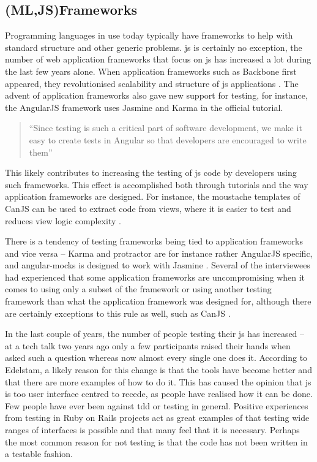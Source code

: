 \documentclass[11pt]{article}
\begin{document}
\subsection{(ML,JS)Frameworks}
\label{subsec:frameworks}

Programming languages in use today typically have frameworks to help with standard structure and other generic problems. \gls{js} is certainly no exception, the number of web application frameworks that focus on \gls{js} has increased a lot during the last few years alone. When application frameworks such as Backbone first appeared, they revolutionised scalability and structure of \gls{js} applications \cite[question~23]{Ahnve}\cite[question~11]{Rovegard}. The advent of application frameworks also gave new support for testing, for instance, the AngularJS framework uses Jasmine and Karma in the official tutorial.

\begin{quote}
``Since testing is such a critical part of software development, we make it easy to create tests in Angular so that developers are encouraged to write them'' \cite{AngularTemplates}
\end{quote}

This likely contributes to increasing the testing of \gls{js} code by developers using such frameworks. This effect is accomplished both through tutorials and the way application frameworks are designed. For instance, the moustache templates of CanJS can be used to extract code from views, where it is easier to test and reduces view logic complexity \cite[question~32]{Ahnve}.

There is a tendency of testing frameworks being tied to application frameworks and vice versa -- Karma and protractor are for instance rather AngularJS specific, and angular-mocks is designed to work with Jasmine \cite[question~7]{Rovegard}. Several of the interviewees had experienced that some application frameworks are uncompromising when it comes to using only a subset of the framework or using another testing framework than what the application framework was designed for, although there are certainly exceptions to this rule as well, such as CanJS \cite[question~22]{Ahnve}\cite[question~41]{Rovegard}.

In the last couple of years, the number of people testing their \gls{js} has increased -- at a tech talk two years ago only a few participants raised their hands when asked such a question whereas now almost every single one does it. \cite[question~1]{Edelstam} According to Edelstam, a likely reason for this change is that the tools have become better and that there are more examples of how to do it. This has caused the opinion that \gls{js} is too user interface centred to recede, as people have realised how it can be done. Few people have ever been against \gls{tdd} or testing in general. Positive experiences from testing in Ruby on Rails projects act as great examples of that testing wide ranges of interfaces is possible and that many feel that it is necessary. Perhaps the most common reason for not testing is that the code has not been written in a testable fashion. \cite[questions~2-3]{Edelstam}
\end{document}
